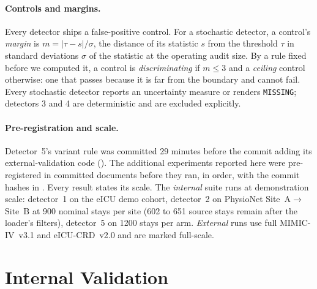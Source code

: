\documentclass[pmlr,twocolumn,10pt]{jmlr}
\begin{document}
\paragraph{Controls and margins.} Every detector ships a false-positive
control. For a stochastic detector, a control's \emph{margin} is
$m=|\tau-s|/\sigma$, the distance of its statistic $s$ from the threshold $\tau$
in standard deviations $\sigma$ of the statistic at the operating audit size. By a
rule fixed before we computed it, a control is \emph{discriminating} if
$m\le 3$ and a \emph{ceiling} control otherwise: one that passes because it is
far from the boundary and cannot fail. Every stochastic detector reports an
uncertainty measure or renders \texttt{MISSING}; detectors 3 and 4 are
deterministic and are excluded explicitly.

\paragraph{Pre-registration and scale.} Detector~5's variant rule was committed
29 minutes before the commit adding its external-validation code
(). The additional experiments reported here were
pre-registered in committed documents before they ran, in order, with the
commit hashes in . Every result states its scale. The
\emph{internal} suite runs at demonstration scale: detector~1 on the eICU demo
cohort, detector~2 on PhysioNet Site~A${\to}$Site~B at 900 nominal stays per
site (602 to 651 source stays remain after the loader's filters), detector~5 on
1200 stays per arm. \emph{External} runs use full MIMIC-IV~v3.1 and
eICU-CRD~v2.0 and are marked full-scale.

\section{Internal Validation}
\label{sec:results}
\end{document}
